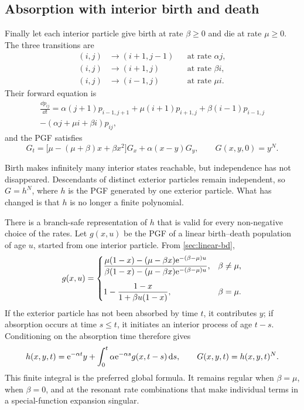 \subsection{Absorption with interior birth and death}
\label{sec:absbirthdeath}

Finally let each interior particle give birth at rate \(\beta\geq0\) and die at
rate \(\mu\geq0\).  The three transitions are
\begin{align*}
  (i,j)&\longrightarrow(i+1,j-1) &&\text{at rate }\alpha j,\\
  (i,j)&\longrightarrow(i+1,j)   &&\text{at rate }\beta i,\\
  (i,j)&\longrightarrow(i-1,j)   &&\text{at rate }\mu i.
\end{align*}
Their forward equation is
\begin{multline}
  \frac{\dd p_{ij}}{\dd t}
  =\alpha(j+1)p_{i-1,j+1}
  +\mu(i+1)p_{i+1,j}
  +\beta(i-1)p_{i-1,j}\\
  -(\alpha j+\mu i+\beta i)p_{ij},
  \label{eq:abd-master}
\end{multline}
and the PGF satisfies
\begin{equation}
  G_t=
  \bigl[\mu-(\mu+\beta)x+\beta x^2\bigr]G_x
  +\alpha(x-y)G_y,
  \qquad G(x,y,0)=y^N.
  \label{PDE3}
\end{equation}

Birth makes infinitely many interior states reachable, but independence has not
disappeared.  Descendants of distinct exterior particles remain independent, so
\(G=h^N\), where \(h\) is the PGF generated by one exterior particle.  What has
changed is that \(h\) is no longer a finite polynomial.

There is a branch-safe representation of \(h\) that is valid for every
non-negative choice of the rates.  Let \(g(x,u)\) be the PGF of a linear
birth--death population of age \(u\), started from one interior particle.  From
\cref{sec:linear-bd},
\begin{equation}
  g(x,u)=
  \begin{cases}
  \displaystyle
  \frac{\mu(1-x)-(\mu-\beta x)\mathrm{e}^{-(\beta-\mu)u}}
       {\beta(1-x)-(\mu-\beta x)\mathrm{e}^{-(\beta-\mu)u}},
  &\beta\neq\mu,\\[14pt]
  \displaystyle
  1-\frac{1-x}{1+\beta u(1-x)},
  &\beta=\mu.
  \end{cases}
  \label{eq:interior-bd-pgf}
\end{equation}
If the exterior particle has not been absorbed by time \(t\), it contributes
\(y\); if absorption occurs at time \(s\leq t\), it initiates an interior process
of age \(t-s\).  Conditioning on the absorption time therefore gives
\begin{equation}
  h(x,y,t)
  =\mathrm{e}^{-\alpha t}y
  +\int_0^t\alpha\mathrm{e}^{-\alpha s}g(x,t-s)\,\mathrm{d} s,
  \qquad
  G(x,y,t)=h(x,y,t)^N.
  \label{eq:abd-integral-solution}
\end{equation}
This finite integral is the preferred global formula.  It remains regular when
\(\beta=\mu\), when \(\beta=0\), and at the resonant rate combinations that make
individual terms in a special-function expansion singular.

